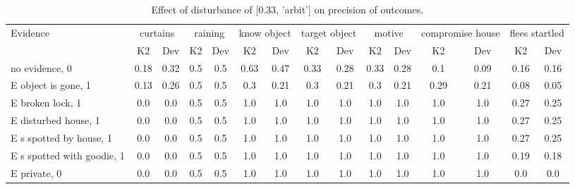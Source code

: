 \begin{table}\begin{tabular}{l|cc|cc|cc|cc|cc|cc|cc}\toprule\multirow{2}{*}{Evidence} & \multicolumn{2}{c}{curtains}& \multicolumn{2}{c}{raining}& \multicolumn{2}{c}{know object}& \multicolumn{2}{c}{target object}& \multicolumn{2}{c}{motive}& \multicolumn{2}{c}{compromise house}& \multicolumn{2}{c}{flees startled}\\& {K2} & {Dev}& {K2} & {Dev}& {K2} & {Dev}& {K2} & {Dev}& {K2} & {Dev}& {K2} & {Dev}& {K2} & {Dev}\\\midrule
no evidence, 0 & \cellcolor{Bittersweet}0.18&\cellcolor{Bittersweet}0.32&0.5&0.5&\cellcolor{Bittersweet}0.63&\cellcolor{Bittersweet}0.47&0.33&0.28&0.33&0.28&0.1&0.09&0.16&0.16\\E object is gone, 1 & \cellcolor{Bittersweet}0.13&\cellcolor{Bittersweet}0.26&0.5&0.5&\cellcolor{Bittersweet}0.3&\cellcolor{Bittersweet}0.21&\cellcolor{Bittersweet}0.3&\cellcolor{Bittersweet}0.21&\cellcolor{Bittersweet}0.3&\cellcolor{Bittersweet}0.21&\cellcolor{Bittersweet}0.29&\cellcolor{Bittersweet}0.21&0.08&0.05\\E broken lock, 1 & 0.0&0.0&0.5&0.5&1.0&1.0&1.0&1.0&1.0&1.0&1.0&1.0&0.27&0.25\\E disturbed house, 1 & 0.0&0.0&0.5&0.5&1.0&1.0&1.0&1.0&1.0&1.0&1.0&1.0&0.27&0.25\\E s spotted by house, 1 & 0.0&0.0&0.5&0.5&1.0&1.0&1.0&1.0&1.0&1.0&1.0&1.0&0.27&0.25\\E s spotted with goodie, 1 & 0.0&0.0&0.5&0.5&1.0&1.0&1.0&1.0&1.0&1.0&1.0&1.0&0.19&0.18\\E private, 0 & 0.0&0.0&0.5&0.5&1.0&1.0&1.0&1.0&1.0&1.0&1.0&1.0&0.0&0.0\\\bottomrule\end{tabular}\caption{Effect of disturbance of [0.33, 'arbit'] on precision of outcomes.}\end{table}